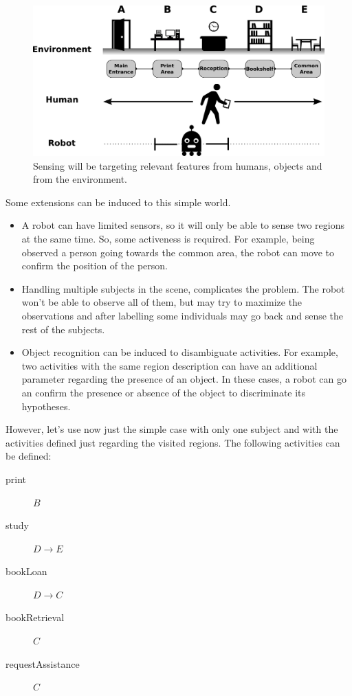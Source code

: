 \begin{figure}[h]
\centering
\includegraphics[width=\textwidth]{fig/ex_library.pdf}
\caption{Sensing will be targeting relevant features from humans, objects and from the environment.}
\label{fig:ex_library}
\end{figure}

Some extensions can be induced to this simple world.
\begin{itemize}
\item A robot can have limited sensors, so it will only be able to sense two regions at the same time. 
So, some activeness is required. For example, being observed a person going towards the common area, the robot can move to confirm the position of the person.
\item Handling multiple subjects in the scene, complicates the problem. The robot won't be able to observe all of them, but may try to maximize the observations and after labelling some individuals may go back and sense the rest of the subjects.
\item Object recognition can be induced to disambiguate activities. For example, two activities with the same region description can have an additional parameter regarding the presence of an object. In these cases, a robot can go an confirm the presence or absence of the object to discriminate its hypotheses. 
\end{itemize} 


However, let's use now just the simple case with only one subject and with the activities defined just regarding the visited regions.
The following activities can be defined:

\begin{description}
\item[print]$B$ 
\item[study]$D \rightarrow E$
\item[bookLoan]$D \rightarrow C$
\item[bookRetrieval]$C$
\item[requestAssistance]$C$
\end{description}

